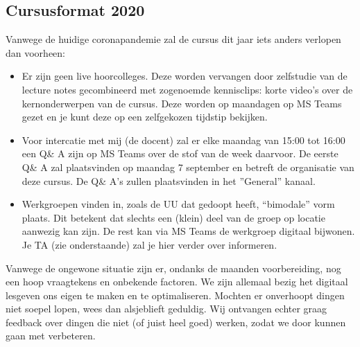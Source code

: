 \documentclass[a4paper,11pt]{article}
\begin{document}
\subsection*{Cursusformat 2020}

Vanwege de huidige coronapandemie zal de cursus dit jaar iets anders verlopen dan voorheen:

\begin{itemize}
  \item
    Er zijn geen live hoorcolleges.
    Deze worden vervangen door zelfstudie van de lecture notes gecombineerd met zogenoemde kennisclips: korte video's over de kernonderwerpen van de cursus.
    Deze worden op maandagen op MS Teams gezet en je kunt deze op een zelfgekozen tijdstip bekijken.

  \item Voor intercatie met mij (de docent) zal er elke maandag van 15:00 tot 16:00 een Q\& A zijn op MS Teams over de stof van de week daarvoor. De eerste Q\& A zal plaatsvinden op maandag 7 september en betreft de organisatie van deze cursus.
  De Q\& A's zullen plaatsvinden in het ''General'' kanaal. %
  \item %
  Werkgroepen vinden in, zoals de UU dat gedoopt heeft, ``bimodale'' vorm plaats. Dit betekent dat slechts een (klein) deel van de groep op locatie aanwezig kan zijn. De rest kan via MS Teams de werkgroep digitaal bijwonen. Je TA (zie onderstaande) zal je hier verder over informeren.
\end{itemize}

Vanwege de ongewone situatie zijn er, ondanks de maanden voorbereiding, nog een hoop vraagtekens en onbekende factoren. We zijn allemaal bezig het digitaal lesgeven ons eigen te maken en te optimaliseren. Mochten er onverhoopt dingen niet soepel lopen, wees dan alsjeblieft geduldig. Wij ontvangen echter graag feedback over dingen die niet (of juist heel goed) werken, zodat we door kunnen gaan met verbeteren.
\end{document}

